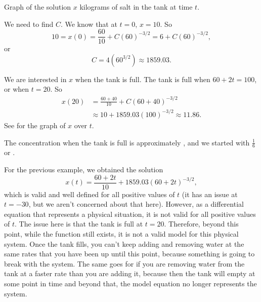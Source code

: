 \documentclass{ximera}
\begin{document}
\begin{exampleSol}
    \begin{mywrapfig}{3.25in}
        \capstart
        \caption{Graph of the solution $x$ kilograms of salt in the tank at time $t$.\label{linear-salt-graph:fig}}
    \end{mywrapfig}
    We need to find $C$.  We know that at $t=0$, $x=10$.  So
    \begin{equation*}
        10 = x(0) = \frac{60}{10} +C{(60)}^{-3/2} = 6 +C{(60)}^{-3/2} ,
    \end{equation*}
    or
    \begin{equation*}
        C=4 ({60}^{3/2}) \approx 1859.03 .
    \end{equation*}
    
    We are interested in $x$ when the tank is full.  The tank is full when $60+2t = 100$, or when $t=20$.  So
    \begin{equation*}
        \begin{split}
            x(20) & = \frac{60+40}{10}+C{(60+40)}^{-3/2} \\
            & \approx 10+1859.03 {(100)}^{-3/2}\approx11.86 .
        \end{split}
    \end{equation*}
    See  for the graph of $x$ over $t$.
    
    The concentration when the tank is full is approximately , and we started with $\frac{1}{6}$ or .
\end{exampleSol}

For the previous example, we obtained the solution 
\begin{equation*}
    x(t) = \frac{60 + 2t}{10} + 1859.03(60+2t)^{-3/2},
\end{equation*}
which is valid and well defined for all positive values of $t$ (it has an issue at $t=-30$, but we aren't concerned about that here). However, as a differential equation that represents a physical situation, it is not valid for all positive values of $t$. The issue here is that the tank is full at $t=20$. Therefore, beyond this point, while the function still exists, it is not a valid model for this physical system. Once the tank fills, you can't keep adding and removing water at the same rates that you have been up until this point, because something is going to break with the system. The same goes for if you are removing water from the tank at a faster rate than you are adding it, because then the tank will empty at some point in time and beyond that, the model equation no longer represents the system.  
\end{document}
